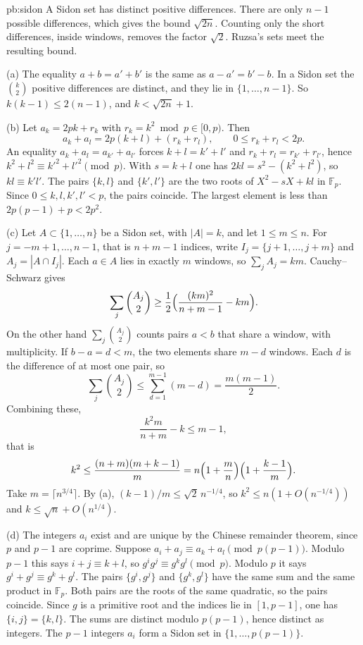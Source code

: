 \begin{solution}{pb:sidon}
\idea A Sidon set has distinct positive differences. There are only $n-1$ possible differences, which gives the bound $\sqrt{2n}$. Counting only the short differences, inside windows, removes the factor $\sqrt2$. Ruzsa's sets meet the resulting bound.

\writeup (a) The equality $a+b=a'+b'$ is the same as $a-a'=b'-b$. In a Sidon set the $\binom k2$ positive differences are distinct, and they lie in $\{1,\dots,n-1\}$. So $k(k-1)\le2(n-1)$, and $k<\sqrt{2n}+1$.

(b) Let $a_k=2pk+r_k$ with $r_k=k^2\bmod p\in[0,p)$. Then
\[
a_k+a_l=2p(k+l)+(r_k+r_l),\qquad 0\le r_k+r_l<2p.
\]
An equality $a_k+a_l=a_{k'}+a_{l'}$ forces $k+l=k'+l'$ and $r_k+r_l=r_{k'}+r_{l'}$, hence $k^2+l^2\equiv k'^2+l'^2\pmod p$. With $s=k+l$ one has $2kl=s^2-(k^2+l^2)$, so $kl\equiv k'l'$. The pairs $\{k,l\}$ and $\{k',l'\}$ are the two roots of $X^2-sX+kl$ in $\mathbb F_p$. Since $0\le k,l,k',l'<p$, the pairs coincide. The largest element is less than $2p(p-1)+p<2p^2$.

(c) Let $A\subset\{1,\dots,n\}$ be a Sidon set, with $|A|=k$, and let $1\le m\le n$. For $j=-m+1,\dots,n-1$, that is $n+m-1$ indices, write $I_j=\{j+1,\dots,j+m\}$ and $A_j=|A\cap I_j|$. Each $a\in A$ lies in exactly $m$ windows, so $\sum_j A_j=km$. Cauchy--Schwarz gives
\[
\sum_j\binom{A_j}2\ge\frac12\Bigl(\frac{(km)^2}{n+m-1}-km\Bigr).
\]
On the other hand $\sum_j\binom{A_j}2$ counts pairs $a<b$ that share a window, with multiplicity. If $b-a=d<m$, the two elements share $m-d$ windows. Each $d$ is the difference of at most one pair, so
\[
\sum_j\binom{A_j}2\le\sum_{d=1}^{m-1}(m-d)=\frac{m(m-1)}2.
\]
Combining these,
\[
\frac{k^2m}{n+m}-k\le m-1,
\]
that is
\[
k^2\le\frac{(n+m)(m+k-1)}m=n\Bigl(1+\frac mn\Bigr)\Bigl(1+\frac{k-1}m\Bigr).
\]
Take $m=\lceil n^{3/4}\rceil$. By (a), $(k-1)/m\le\sqrt2\,n^{-1/4}$, so $k^2\le n(1+O(n^{-1/4}))$ and $k\le\sqrt n+O(n^{1/4})$.

(d) The integers $a_i$ exist and are unique by the Chinese remainder theorem, since $p$ and $p-1$ are coprime. Suppose $a_i+a_j\equiv a_k+a_l\pmod{p(p-1)}$. Modulo $p-1$ this says $i+j\equiv k+l$, so $g^ig^j\equiv g^kg^l\pmod p$. Modulo $p$ it says $g^i+g^j\equiv g^k+g^l$. The pairs $\{g^i,g^j\}$ and $\{g^k,g^l\}$ have the same sum and the same product in $\mathbb F_p$. Both pairs are the roots of the same quadratic, so the pairs coincide. Since $g$ is a primitive root and the indices lie in $[1,p-1]$, one has $\{i,j\}=\{k,l\}$. The sums are distinct modulo $p(p-1)$, hence distinct as integers. The $p-1$ integers $a_i$ form a Sidon set in $\{1,\dots,p(p-1)\}$.


\end{solution}

